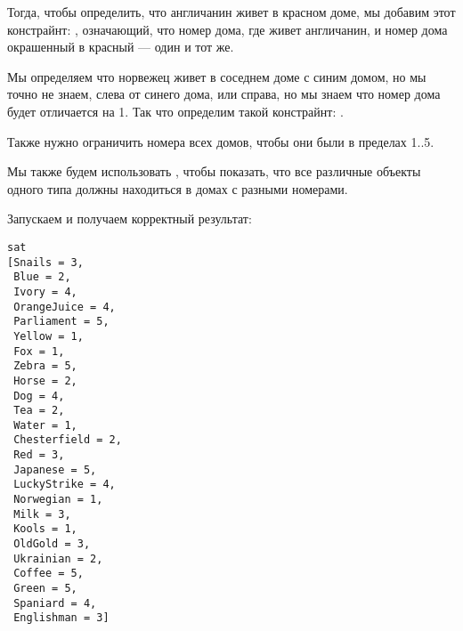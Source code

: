 Тогда, чтобы определить, что англичанин живет в красном доме, мы добавим этот констрайнт: , означающий, что номер дома, где живет англичанин, и номер дома окрашенный в красный --- один и тот же.

Мы определяем что норвежец живет в соседнем доме с синим домом, но мы точно не знаем, слева от синего дома, или справа,
но мы знаем что номер дома будет отличается на 1.
Так что определим такой констрайнт: .

Также нужно ограничить номера всех домов, чтобы они были в пределах 1..5.

Мы также будем использовать , чтобы показать, что все различные объекты одного типа должны находиться в домах
с разными номерами.



Запускаем и получаем корректный результат:

\begin{lstlisting}
sat
[Snails = 3,
 Blue = 2,
 Ivory = 4,
 OrangeJuice = 4,
 Parliament = 5,
 Yellow = 1,
 Fox = 1,
 Zebra = 5,
 Horse = 2,
 Dog = 4,
 Tea = 2,
 Water = 1,
 Chesterfield = 2,
 Red = 3,
 Japanese = 5,
 LuckyStrike = 4,
 Norwegian = 1,
 Milk = 3,
 Kools = 1,
 OldGold = 3,
 Ukrainian = 2,
 Coffee = 5,
 Green = 5,
 Spaniard = 4,
 Englishman = 3]
 \end{lstlisting}

